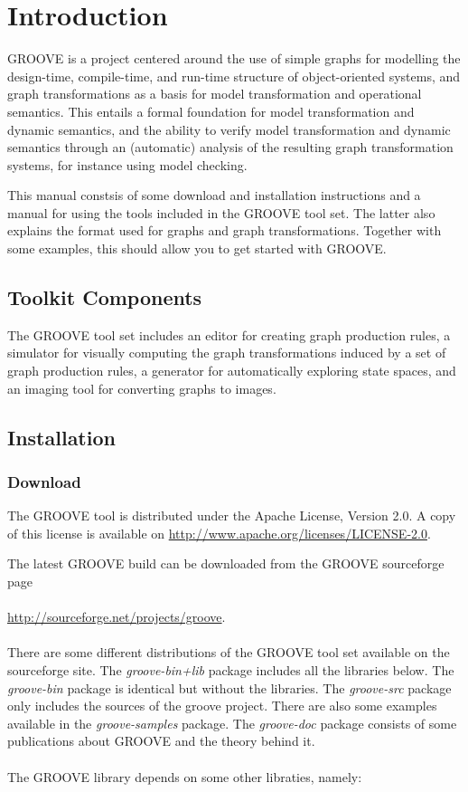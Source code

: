 \section{Introduction}

GROOVE is a project centered around the use of simple graphs for
modelling the design-time, compile-time, and run-time structure of
object-oriented systems, and graph transformations as a basis for
model transformation and operational semantics. This entails a formal
foundation for  model transformation and dynamic semantics, and the
ability to verify model transformation and dynamic semantics through
an (automatic) analysis of the resulting graph transformation systems,
for instance using model checking.

This manual constsis of some download and installation instructions and a
manual for using the tools included in the GROOVE tool set. The latter also
explains the format used for graphs and graph transformations. Together
with some examples, this should allow you to get started with GROOVE.

\subsection{Toolkit Components}

The GROOVE tool set includes an editor for creating graph production
rules, a simulator for visually computing the graph transformations
induced by a set of graph production rules, a generator for
automatically exploring state spaces, and an imaging tool for
converting graphs to images.


\subsection{Installation}

\subsubsection{Download}

The GROOVE tool is distributed under the Apache License, Version 2.0. A copy of this license is available on 
\url{http://www.apache.org/licenses/LICENSE-2.0}.

\bigskip

The latest GROOVE build can be downloaded from the GROOVE sourceforge page\\
\\
\url{http://sourceforge.net/projects/groove}.\\
\\
There are some different distributions of the GROOVE tool set available on the sourceforge site. The \emph{groove-bin+lib} package includes all the libraries below. The \emph{groove-bin} package is identical but without the libraries. The \emph{groove-src} package only includes the sources of the groove project. There are also some examples available in the \emph{groove-samples} package. The \emph{groove-doc} package consists of some publications about GROOVE and the theory behind it. 
\\\\
The GROOVE library depends on some other libraties, namely:

